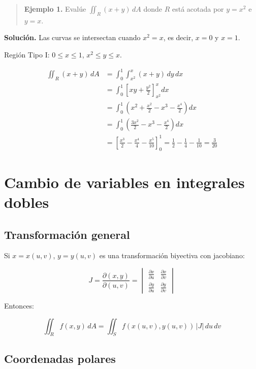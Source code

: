 \documentclass[
]{book}
\begin{document}
\begin{quote}
\textbf{Ejemplo 1.} Evalúe \(\iint_R (x + y) \, dA\) donde \(R\) está acotada por \(y = x^2\) e \(y = x\).
\end{quote}

\textbf{Solución.} Las curvas se intersectan cuando \(x^2 = x\), es decir, \(x = 0\) y \(x = 1\).

Región Tipo I: \(0 \leq x \leq 1\), \(x^2 \leq y \leq x\).

\[
\begin{aligned}
\iint_R (x + y) \, dA &= \int_0^1 \int_{x^2}^x (x + y) \, dy \, dx \\
&= \int_0^1 \left[ xy + \frac{y^2}{2} \right]_{x^2}^x dx \\
&= \int_0^1 \left( x^2 + \frac{x^2}{2} - x^3 - \frac{x^4}{2} \right) dx \\
&= \int_0^1 \left( \frac{3x^2}{2} - x^3 - \frac{x^4}{2} \right) dx \\
&= \left[ \frac{x^3}{2} - \frac{x^4}{4} - \frac{x^5}{10} \right]_0^1 = \frac{1}{2} - \frac{1}{4} - \frac{1}{10} = \frac{3}{20}
\end{aligned}
\]

\section{Cambio de variables en integrales dobles}\label{cambio-de-variables-en-integrales-dobles}

\subsection{Transformación general}\label{transformaciuxf3n-general}

Si \(x = x(u, v)\), \(y = y(u, v)\) es una transformación biyectiva con jacobiano:

\[
J = \frac{\partial(x, y)}{\partial(u, v)} = \begin{vmatrix}
\frac{\partial x}{\partial u} & \frac{\partial x}{\partial v} \\
\frac{\partial y}{\partial u} & \frac{\partial y}{\partial v}
\end{vmatrix}
\]

Entonces:

\[
\iint_R f(x, y) \, dA = \iint_S f(x(u, v), y(u, v)) \, |J| \, du \, dv
\]

\subsection{Coordenadas polares}\label{coordenadas-polares}
\end{document}

